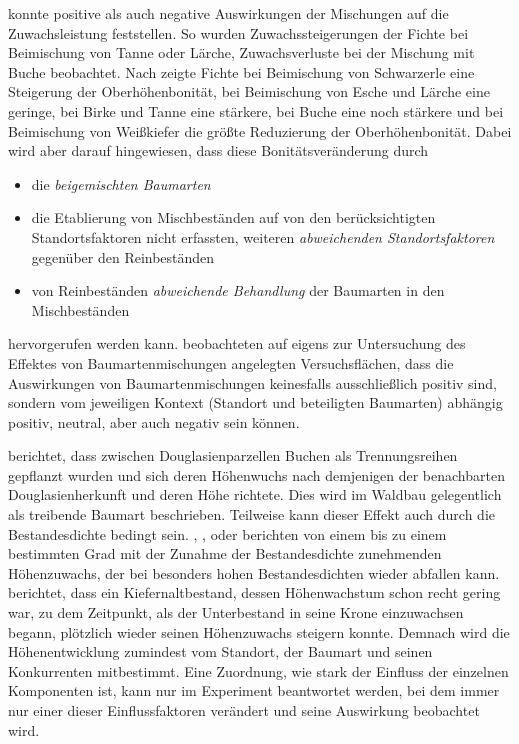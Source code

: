 \documentclass[twocolumn, paper=a4, fontsize=10pt, bibliography=totoc, index=totoc]{scrartcl}
\begin{document}
\citet{vospernik2021grundflaechenzuwachs} konnte positive als auch
negative Auswirkungen der Mischungen auf die Zuwachsleistung
feststellen. So wurden Zuwachssteigerungen der Fichte bei Beimischung
von Tanne oder Lärche, Zuwachsverluste bei der Mischung mit Buche
beobachtet. Nach \citet{kindermann2018siteIndex} zeigte Fichte bei
Beimischung von Schwarzerle eine Steigerung der Oberhöhenbonität, bei
Beimischung von Esche und Lärche eine geringe, bei Birke und Tanne eine
stärkere, bei Buche eine noch stärkere und bei Beimischung von
Weißkiefer die größte Reduzierung der Oberhöhenbonität. Dabei wird
aber darauf hingewiesen, dass diese Bonitätsveränderung durch
\begin{itemize}
\item die \emph{beigemischten Baumarten}
\item die Etablierung von Mischbeständen auf von den berücksichtigten
  Standortsfaktoren nicht erfassten, weiteren \emph{abweichenden
    Standortsfaktoren} gegenüber den Reinbeständen
\item von Reinbeständen \emph{abweichende Behandlung} der Baumarten
  in den Mischbeständen
\end{itemize}
hervorgerufen werden kann. \citet{vanclay2022competitioninMixedSpecies}
beobachteten auf eigens zur Untersuchung des Effektes von Baumartenmischungen
angelegten Versuchsflächen, dass die Auswirkungen von Baumartenmischungen
keinesfalls ausschließlich positiv sind, sondern vom jeweiligen Kontext
(Standort und beteiligten Baumarten) abhängig positiv, neutral, aber auch
negativ sein können.

\citet[S.~259]{muench1928KlimarassenDerDouglasie} berichtet, dass zwischen
Douglasienparzellen Buchen als Trennungsreihen gepflanzt wurden und sich deren
Höhenwuchs nach demjenigen der benachbarten Douglasienherkunft und deren Höhe
richtete. Dies wird im Waldbau gelegentlich als treibende Baumart beschrieben.
Teilweise kann dieser Effekt auch durch die Bestandesdichte bedingt sein.
\citet{boehmerle1903BestandesdichteUndBestandeshoehe},
\citet{schmied1928UeberDenEinflussDerBestandesdichteAufDieBestandeshoeheInJuengerenBuchenbestaenden},
\citet[S.~75\,f.]{wiedemann1951Ertragskunde} oder
\citet[S.~46\,f.]{assmann1961Waldertraskunde} berichten von einem bis zu einem
bestimmten Grad mit der Zunahme der Bestandesdichte zunehmenden Höhenzuwachs,
der bei besonders hohen Bestandesdichten wieder abfallen kann.
\citet{zundel1960ErtragskundlicheUntersuchungenInZweialtrigenBestaendenNordwuerttembergs}
berichtet, dass ein Kiefernaltbestand, dessen Höhenwachstum schon
recht gering war, zu dem Zeitpunkt, als der Unterbestand in seine
Krone einzuwachsen begann, plötzlich wieder seinen Höhenzuwachs steigern
konnte. Demnach wird die Höhenentwicklung zumindest vom Standort, der Baumart und seinen Konkurrenten mitbestimmt. Eine Zuordnung, wie stark der Einfluss der einzelnen Komponenten ist, kann nur im Experiment beantwortet werden, bei dem immer nur einer dieser Einflussfaktoren verändert und seine Auswirkung beobachtet wird.
\end{document}
